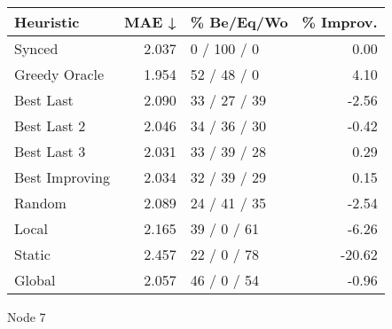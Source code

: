\begin{tabular}{lrlr}
\toprule
\textbf{Heuristic} & \textbf{MAE ↓} & \textbf{\% Be/Eq/Wo} & \textbf{\% Improv.} \\
\midrule
            Synced &          2.037 &          0 / 100 / 0 &                0.00 \\
     Greedy Oracle &          1.954 &          52 / 48 / 0 &                4.10 \\
         Best Last &          2.090 &         33 / 27 / 39 &               -2.56 \\
       Best Last 2 &          2.046 &         34 / 36 / 30 &               -0.42 \\
       Best Last 3 &          2.031 &         33 / 39 / 28 &                0.29 \\
    Best Improving &          2.034 &         32 / 39 / 29 &                0.15 \\
            Random &          2.089 &         24 / 41 / 35 &               -2.54 \\
             Local &          2.165 &          39 / 0 / 61 &               -6.26 \\
            Static &          2.457 &          22 / 0 / 78 &              -20.62 \\
            Global &          2.057 &          46 / 0 / 54 &               -0.96 \\
\bottomrule
\end{tabular}
\caption{Node 7}
\label{tab:hr_non_lr05_le2_bs2_7}
